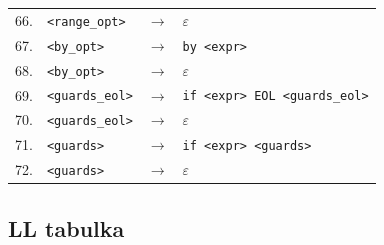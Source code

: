 {\begin{longtable}{rlcl}
66. & \texttt{<range\_opt>} & $\rightarrow$ & $\varepsilon$ \\
67. & \texttt{<by\_opt>} & $\rightarrow$ & \texttt{by <expr>} \\
68. & \texttt{<by\_opt>} & $\rightarrow$ & $\varepsilon$ \\
69. & \texttt{<guards\_eol>} & $\rightarrow$ & \texttt{if <expr> EOL <guards\_eol>} \\
70. & \texttt{<guards\_eol>} & $\rightarrow$ & $\varepsilon$ \\
71. & \texttt{<guards>} & $\rightarrow$ & \texttt{if <expr> <guards>} \\
72. & \texttt{<guards>} & $\rightarrow$ & $\varepsilon$ \\
\end{longtable}}


\subsection{LL tabulka}

